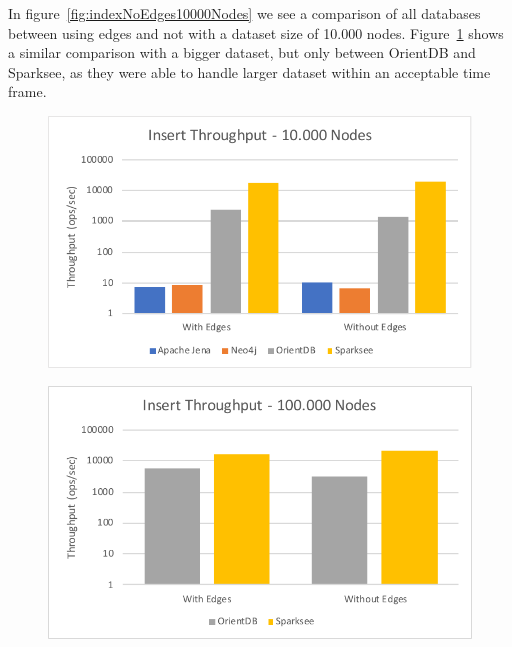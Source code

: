 In figure~\ref{fig:indexNoEdges10000Nodes} we see a comparison of all databases between using edges and not with a dataset size of 10.000 nodes.
Figure~\ref{fig:indexNoEdges100000Nodes} shows a similar comparison with a bigger dataset,
but only between OrientDB and Sparksee,
as they were able to handle larger dataset within an acceptable time frame.

\begin{figure}[h!]
  \begin{minipage}{.5\textwidth}
    \centering
    \includegraphics[width=\textwidth]{images/throughput/indexNoEdges10000Nodes}
    \label{fig:indexNoEdges10000Nodes}
  \end{minipage}
  \begin{minipage}{.5\textwidth}
    \centering
    \includegraphics[width=\textwidth]{images/throughput/indexNoEdges100000Nodes}
    \label{fig:indexNoEdges100000Nodes}
  \end{minipage}
\end{figure}

